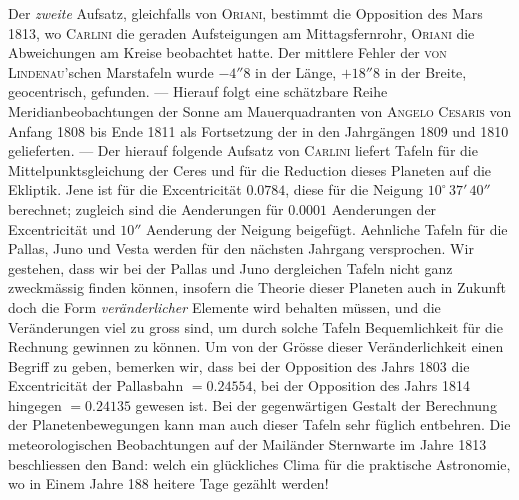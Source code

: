 Der \emph{zweite} Aufsatz, gleichfalls von \textsc{Oriani}, bestimmt die Opposition des Mars 1813, wo \textsc{Carlini} die geraden Aufsteigungen am Mittagsfernrohr, \textsc{Oriani} die Abweichungen am Kreise beobachtet hatte. Der mittlere Fehler der \textsc{von Lindenau}'schen Marstafeln wurde $-4''8$ in der Länge, $+18''8$ in der Breite, geocentrisch, gefunden. --- Hierauf folgt eine schätzbare Reihe Meridianbeobachtungen der Sonne am Mauerquadranten von \textsc{Angelo Cesaris} von Anfang 1808 bis Ende 1811 als Fortsetzung der in den Jahrgängen 1809 und 1810 gelieferten. --- Der hierauf folgende Aufsatz von \textsc{Carlini} liefert Tafeln für die Mittelpunktsgleichung der Ceres und für die Reduction dieses Planeten auf die Ekliptik. Jene ist für die Excentricität $0.0784$, diese für die Neigung $10^\circ\,37'\,40''$ berechnet; zugleich sind die Aenderungen für $0.0001$ Aenderungen der Excentricität und $10''$ Aenderung der Neigung beigefügt. Aehnliche Tafeln für die Pallas, Juno und Vesta werden für den nächsten Jahrgang versprochen. Wir gestehen, dass wir bei der Pallas und Juno dergleichen Tafeln nicht ganz zweckmässig finden können, insofern die Theorie dieser Planeten auch in Zukunft doch die Form \emph{veränderlicher} Elemente wird behalten müssen, und die Veränderungen viel zu gross sind, um durch solche Tafeln Bequemlichkeit für die Rechnung gewinnen zu können. Um von der Grösse dieser Veränderlichkeit einen Begriff zu geben, bemerken wir, dass bei der Opposition des Jahrs 1803 die Excentricität der Pallasbahn $=0.24554$, bei der
Opposition des Jahrs 1814 hingegen $=0.24135$ gewesen ist. Bei der gegenwärtigen Gestalt der
Berechnung der Planetenbewegungen kann man auch dieser Tafeln sehr füglich entbehren. Die
meteorologischen Beobachtungen auf der Mailänder Sternwarte im Jahre 1813 beschliessen den Band:
welch ein glückliches Clima für die praktische Astronomie, wo in Einem Jahre 188 heitere Tage
gezählt werden!

